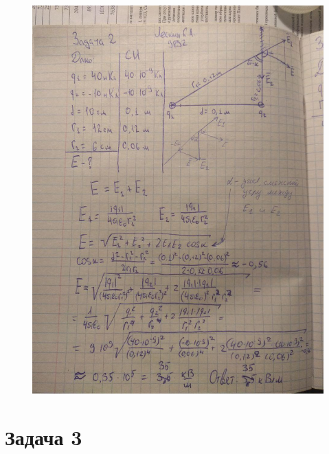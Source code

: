 \documentclass[12pt,a4paper]{article}  %
\begin{document}
	\begin{figure}[hpt!]
		\centering
		\includegraphics[width=1\linewidth]{photo/task2_solution_update_30_09}
	\end{figure}
	
	\section*{Задача 3}
	
\end{document}
